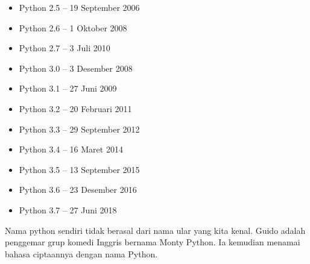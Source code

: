 \begin{itemize}
\item    Python 2.5 – 19 September 2006
\item	 Python 2.6 – 1 Oktober 2008
\item	 Python 2.7 – 3 Juli 2010
\item	 Python 3.0 – 3 Desember 2008
\item	 Python 3.1 – 27 Juni 2009
\item	 Python 3.2 – 20 Februari 2011
\item	 Python 3.3 – 29 September 2012
\item	 Python 3.4 – 16 Maret 2014
\item	 Python 3.5 – 13 September 2015
\item	 Python 3.6 – 23 Desember 2016
\item	 Python 3.7 – 27 Juni 2018
\end{itemize}
Nama python sendiri tidak berasal dari nama ular yang kita kenal. Guido adalah penggemar grup komedi Inggris bernama Monty Python. Ia kemudian menamai bahasa ciptaannya dengan nama Python.


